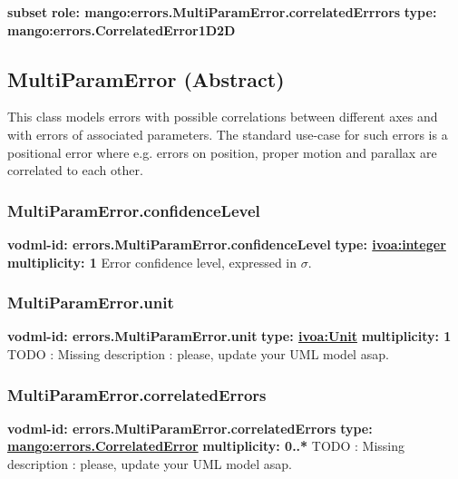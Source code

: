     \noindent \textbf{subset} \newline
    \indent   \textbf{role: mango:errors.MultiParamError.correlatedErrrors} \newline
    \indent   \textbf{type: mango:errors.CorrelatedError1D2D} \newline


  \subsection{MultiParamError (Abstract)}
  \label{sect:errors.MultiParamError}
    This class models errors with possible correlations between different axes and with errors of associated parameters. The standard use-case for such errors is a positional error where e.g. errors on position, proper motion and parallax are correlated to each other.

    \subsubsection{MultiParamError.confidenceLevel}
      \textbf{vodml-id: errors.MultiParamError.confidenceLevel} \newline
      \textbf{type: \hyperref[sect:ivoa]{ivoa:integer}} \newline
      \textbf{multiplicity: 1} \newline 
      Error confidence level, expressed in $\sigma$.

    \subsubsection{MultiParamError.unit}
      \textbf{vodml-id: errors.MultiParamError.unit} \newline
      \textbf{type: \hyperref[sect:ivoa]{ivoa:Unit}} \newline
      \textbf{multiplicity: 1} \newline 
      TODO : Missing description : please, update your UML model asap.

    \subsubsection{MultiParamError.correlatedErrors}
      \textbf{vodml-id: errors.MultiParamError.correlatedErrors} \newline
      \textbf{type: \hyperref[sect:errors.CorrelatedError]{mango:errors.CorrelatedError}} \newline
      \textbf{multiplicity: 0..*} \newline 
      TODO : Missing description : please, update your UML model asap.

